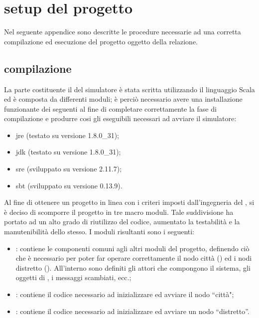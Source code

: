 %
\chapter*{setup del progetto}
\label{setup}
Nel seguente appendice sono descritte le procedure necessarie ad una corretta compilazione ed esecuzione del progetto oggetto della relazione.

\section*{compilazione}
\label{setup-compile}
La parte costituente il  del simulatore è stata scritta utilizzando il linguaggio Scala ed è composta da differenti moduli; è perciò necessario avere una installazione funzionante dei seguenti  al fine di completare correttamente la fase di compilazione e produrre cosi gli eseguibili necessari ad avviare il simulatore:

\begin{itemize}
\item{\ac{jre} (\small{testato su versione 1.8.0\_31});}
\item{\ac{jdk} (\small{testato su versione 1.8.0\_31});}
\item{\ac{sre} (\small{sviluppato su versione 2.11.7});}
\item{\ac{sbt} (\small{sviluppato su versione 0.13.9}).}
\end{itemize}

Al fine di ottenere un progetto in linea con i criteri imposti dall'ingegneria del , si è deciso di scomporre il progetto in tre macro moduli. Tale suddivisione ha portato ad un alto grado di riutilizzo del codice, aumentato la testabilità e la manutenibilità dello stesso. I moduli risultanti sono i seguenti:

\begin{itemize}
\item{: contiene le componenti comuni agli altri moduli del progetto, definendo ciò che è necessario per poter far operare correttamente il nodo città () ed i nodi distretto (). All'interno sono definiti gli attori che compongono il sistema, gli oggetti di , i messaggi scambiati, ecc.;}
\item{: contiene il codice necessario ad inizializzare ed avviare il nodo ``città";}
\item{: contiene il codice necessario ad inizializzare ed avviare un nodo ``distretto''.}
\end{itemize}

